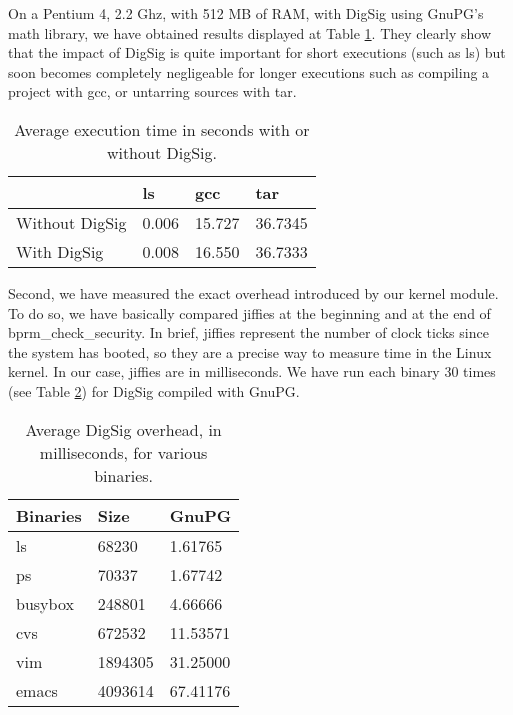 \documentclass{article}
\begin{document}
On a Pentium 4, 2.2 Ghz, with 512 MB of RAM, with DigSig using GnuPG's
math library, we have obtained results displayed at Table \ref{tab:exectime}. They
clearly show that the impact of DigSig is quite important for short
executions (such as ls) but soon becomes completely negligeable for
longer executions such as compiling a project with gcc, or untarring
sources with tar.


\begin{table}[ht]
\begin{center}
\begin{tabular}{|l|l|l|l|}
\hline
 & ls & gcc   & tar    \\ 
\hline
Without DigSig & 0.006 & 15.727 & 36.7345 \\  
\hline
With DigSig    & 0.008 & 16.550 & 36.7333 \\
\hline
\end{tabular}
\caption{Average execution time in seconds with or without DigSig.}
\label{tab:exectime}
\end{center}
\end{table}



Second, we have measured the exact overhead introduced by our kernel
module. To do so, we have basically compared jiffies at the beginning
and at the end of bprm\_check\_security. In brief, jiffies represent
the number of clock ticks since the system has booted, so they
are a precise way to measure time in the Linux kernel. In our case,
jiffies are in milliseconds. We have run each binary 30 times
(see Table \ref{tab:overhead}) for DigSig compiled with GnuPG.

\begin{table}[ht]
\begin{center}
\begin{tabular}{|l|l|l|}
\hline
Binaries  & Size  &  GnuPG   \\
\hline 
ls &   68230 &  1.61765 \\ 
\hline 
ps &   70337 &  1.67742 \\
\hline 
busybox & 248801 &  4.66666 \\
\hline 
cvs &  672532 & 11.53571 \\
\hline 
vim & 1894305 & 31.25000 \\
\hline 
emacs & 4093614 & 67.41176 \\
\hline 
\end{tabular}
\caption{Average DigSig overhead, in milliseconds, for various 
binaries.}
\label{tab:overhead}
\end{center}
\end{table}
\end{document}
